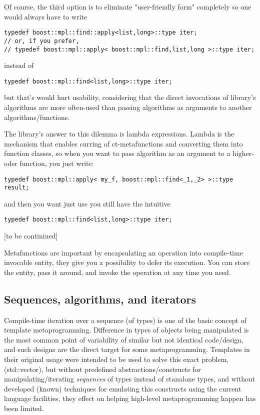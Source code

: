 \documentclass{netobjectdays}
\begin{document}
Of course, the third option is to eliminate 
"user-friendly form" completely so one would always 
have to write

{\footnotesize
\begin{verbatim}
typedef boost::mpl::find::apply<list,long>::type iter;
// or, if you prefer,
// typedef boost::mpl::apply< boost::mpl::find,list,long >::type iter;
\end{verbatim}
}

instead of 

{\footnotesize
\begin{verbatim}
typedef boost::mpl::find<list,long>::type iter;
\end{verbatim}
}

but that's would hurt usability, considering that the direct 
invocations of library's algorithms are more often-used than 
passing algorithms as arguments to another 
algorithms/functions. 

The library's answer to this dilemma is lambda expressions. 
Lambda is the mechanism that enables curring of 
ct-metafunctions and converting them into function classes, 
so when you want to pass  algorithm as an argument 
to a higher-oder function, you just write:

{\footnotesize
\begin{verbatim}
typedef boost::mpl::apply< my_f, boost::mpl::find<_1,_2> >::type result;
\end{verbatim}
}

and then you want just use %
you still have the intuitive

{\footnotesize
\begin{verbatim}
typedef boost::mpl::find<list,long>::type iter;
\end{verbatim}
}


[to be continiued]


Metafunctions are important by encapsulating an operation into 
compile-time invocable entity, they give you a possibility to 
defer its execution. You can store the entity, pass it around, 
and invoke the operation at any time you need.

\subsection{Sequences, algorithms, and iterators}

Compile-time iteration over a sequence (of types) is one of 
the basic concept of template metaprogramming. Difference in 
types of objects being manipulated is the most common point 
of variability of similar but not identical code/design, and 
such designs are the direct target for some metaprogramming. 
Templates in their original usage were intended to be used to 
solve this exact problem, (std::vector), but without predefined 
abstractions/constructs for manipulating/iterating 
\emph{sequences} of types instead of stanalone types, and 
without developed (known) techniques for emulating this 
constructs using the current language facilities, they effect 
on helping high-level metaprogramming happen has been limited. 
\end{document}

